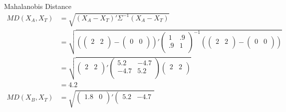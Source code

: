 \documentclass{beamer}
\numberwithin{equation}{section}
\begin{document}
\begin{frame}{Mahalanobis Distance}
\begin{align*}
MD(X_A,X_{T}) &= \sqrt{
(X_A-X_T)'\Sigma^{-1}(X_A-X_T)}\\
 &=  \sqrt{
(\left(
       \begin{array}{cc}
         2 & 2 \\
       \end{array}
     \right)-\left(
                \begin{array}{cc}
                  0 &  0 \\
                \end{array}
              \right))' \left(
               \begin{array}{cc}
                  1 &  .9 \\
                   .9 & 1 \\
               \end{array}
             \right)^{-1} (\left(
       \begin{array}{cc}
         2 & 2 \\
       \end{array}
     \right)-\left(
                \begin{array}{cc}
                    0 &  0 \\
                \end{array}
              \right))}\\
& =  \sqrt{
\left(
       \begin{array}{cc}
         2 &  2 \\
       \end{array}
     \right)' \left(
               \begin{array}{cc}
                   5.2 &  -4.7 \\
                   -4.7 & 5.2 \\
               \end{array}
             \right)\left(
       \begin{array}{cc}
         2 &  2 \\
       \end{array}
     \right)}\\
 &= 4.2\\
MD(X_B,X_{T}) &=  \sqrt{
\left(
       \begin{array}{cc}
         1.8 &  0 \\
       \end{array}
     \right)' \left(
               \begin{array}{cc}
                   5.2 &  -4.7 \\

\end{array}}
\end{align*}
\end{frame}
\end{document}
